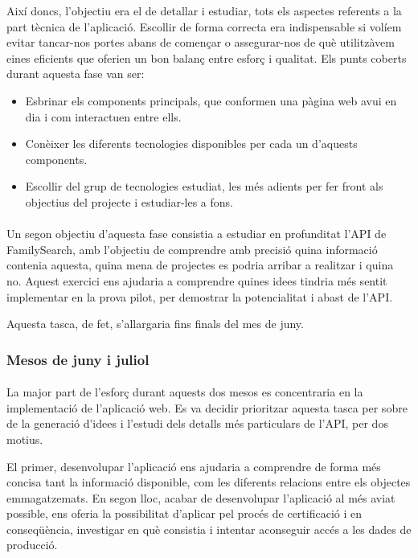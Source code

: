             Així doncs, l'objectiu era el de detallar i estudiar, tots els aspectes referents a la part tècnica de l’aplicació. Escollir de forma correcta era indispensable si volíem evitar tancar-nos portes abans de començar o assegurar-nos de què utilitzàvem eines eficients que oferien un bon balanç entre esforç i qualitat. Els punts coberts durant aquesta fase van ser:

            \begin{itemize}
                \item Esbrinar els components principals, que conformen una pàgina web avui en dia i com interactuen entre ells.
                \item Conèixer les diferents tecnologies disponibles per cada un d’aquests components.
                \item Escollir del grup de tecnologies estudiat, les més adients per fer front als objectius del projecte i estudiar-les a fons.
            \end{itemize}

            \paragraph{}
            Un segon objectiu d’aquesta fase consistia a estudiar en profunditat l'\gls{API} de Family\-Search, amb l'objectiu de comprendre amb precisió quina informació contenia aquesta, quina mena de projectes es podria arribar a realitzar i quina no. Aquest exercici ens ajudaria a comprendre quines idees tindria més sentit implementar en la prova pilot, per demostrar la potencialitat i abast de l'\gls{API}.

            Aquesta tasca, de fet, s'allargaria fins finals del mes de juny.

        \subsubsection{Mesos de juny i juliol}

            \paragraph{}
            La major part de l’esforç durant aquests dos mesos es concentraria en la implementació de l’aplicació web. Es va decidir prioritzar aquesta tasca per sobre de la generació d'idees i l'estudi dels detalls més particulars de l'API, per dos motius.

            El primer, desenvolupar l’aplicació ens ajudaria a comprendre de forma més concisa tant la informació disponible, com les diferents relacions entre els objectes emmagatzemats. En segon lloc, acabar de desenvolupar l'aplicació al més aviat possible, ens oferia la possibilitat d’aplicar pel procés de certificació i en conseqüència, investigar en què consistia i intentar aconseguir accés a les dades de producció.

